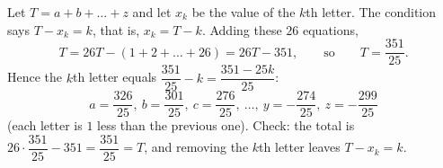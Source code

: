 Let $T=a+b+\dots+z$ and let $x_k$ be the value of the $k$th letter. The condition says $T-x_k=k$, that is, $x_k=T-k$. Adding these $26$ equations,
\[
T=26T-(1+2+\dots+26)=26T-351,\qquad\text{so}\qquad T=\dfrac{351}{25}.
\]
Hence the $k$th letter equals $\dfrac{351}{25}-k=\dfrac{351-25k}{25}$:
\[
\boxed{a=\dfrac{326}{25},\ b=\dfrac{301}{25},\ c=\dfrac{276}{25},\ \dots,\ y=-\dfrac{274}{25},\ z=-\dfrac{299}{25}}
\]
(each letter is $1$ less than the previous one). Check: the total is $26\cdot\dfrac{351}{25}-351=\dfrac{351}{25}=T$, and removing the $k$th letter leaves $T-x_k=k$.
